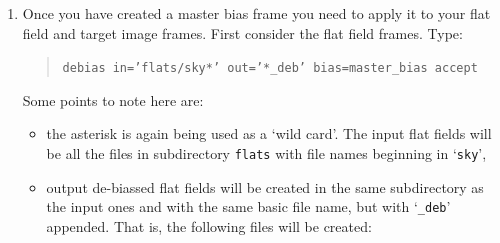 \documentclass[twoside,11pt]{article}
\newcommand{\xref}[3]{#1}
\begin{document}
\begin{enumerate}
   The points to note here are:

  \begin{itemize}

    \item the input files are specified as {\tt 'bias/*'}.  Here the
     asterisk (`{\tt *}') is being used as a `wild card' and all the
     files in subdirectory {\tt bias} will be read.  Again note the
     use of single quotes to prevent `special characters' from being
     interpreted by the Unix shell,

    \item the master bias frame will be written to file {\tt
     master\_bias.sdf} in the current directory,

    \item the option {\tt zero=true} specifies that the mean values of
     the pixels in the input images are to be adjusted to zero prior
     to combining them.  This option is the preferred method and normal
     default.  However, it can only be used if the CCD chip has bias
     strips which were specified using {\tt ccdsetup}.  If your data
     do not have bias strips you will need to set {\tt zero=false}.
     See \xref{SUN/139}{sun139}{} for further details,

    \item again the {\tt accept} option is used to suppress additional
     prompts.

  \end{itemize}

  \item Once you have created a master bias frame you need to apply it
   to your flat field and target image frames.  First consider the
   flat field frames.  Type:

  \begin{quote}
   {\tt debias in='flats/sky*' out='*\_deb' bias=master\_bias accept}
  \end{quote}

   Some points to note here are:

  \begin{itemize}

    \item the asterisk is again being used as a `wild card'.  The input
     flat fields will be all the files in subdirectory {\tt flats} with
     file names beginning in `{\tt sky}',

    \item output de-biassed flat fields will be created in the same
     subdirectory as the input ones and with the same basic file name,
     but with `{\tt \_deb}' appended.  That is, the following files will
     be created:


\end{itemize}
\end{enumerate}
\end{document}
